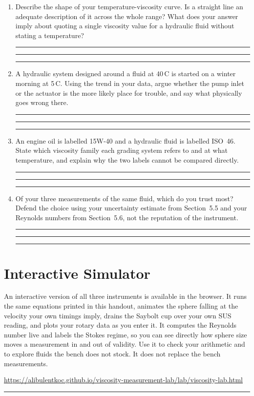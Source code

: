 \documentclass[11pt,a4paper]{article}
\newcommand{\answerline}{\par\vspace{0.9em}\noindent\rule{\linewidth}{0.4pt}}
\begin{document}
\begin{enumerate}
  \item Describe the shape of your temperature-viscosity curve. Is a straight line an adequate
        description of it across the whole range? What does your answer imply about quoting a
        single viscosity value for a hydraulic fluid without stating a temperature?
        \answerline\answerline\answerline

  \item A hydraulic system designed around a fluid at 40\,\textdegree C is started on a winter
        morning at 5\,\textdegree C. Using the trend in your data, argue whether the pump inlet
        or the actuator is the more likely place for trouble, and say what physically goes wrong
        there.
        \answerline\answerline\answerline

  \item An engine oil is labelled 15W-40 and a hydraulic fluid is labelled ISO~46. State which
        viscosity family each grading system refers to and at what temperature, and explain why
        the two labels cannot be compared directly.
        \answerline\answerline\answerline

  \item Of your three measurements of the same fluid, which do you trust most? Defend the choice
        using your uncertainty estimate from Section~5.5 and your Reynolds numbers from
        Section~5.6, not the reputation of the instrument.
        \answerline\answerline\answerline
\end{enumerate}

\section{Interactive Simulator}
An interactive version of all three instruments is available in the browser. It runs the same
equations printed in this handout, animates the sphere falling at the velocity your own timings
imply, drains the Saybolt cup over your own SUS reading, and plots your rotary data as you enter
it. It computes the Reynolds number live and labels the Stokes regime, so you can see directly
how sphere size moves a measurement in and out of validity. Use it to check your arithmetic and
to explore fluids the bench does not stock. It does not replace the bench measurements.

\smallskip
\noindent\small\url{https://alibulentkoc.github.io/viscosity-measurement-lab/lab/viscosity-lab.html}

\vfill
\noindent\rule{\linewidth}{0.4pt}
\end{document}
